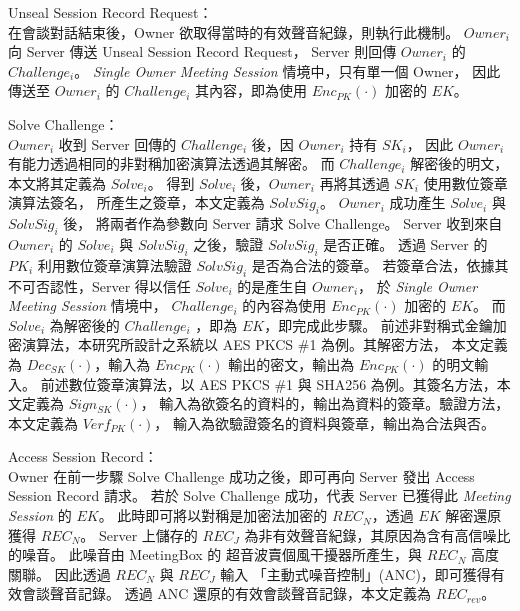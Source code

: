 \begin{steps}
    \item Unseal Session Record Request：\\
        在會談對話結束後，Owner 欲取得當時的有效聲音紀錄，則執行此機制。
        $Owner_{i}$ 向 Server 傳送 Unseal Session Record Request，
        Server 則回傳 $Owner_{i}$ 的 $Challenge_{i}$。
        {\it Single Owner Meeting Session} 情境中，只有單一個 Owner，
        因此傳送至 $Owner_{i}$ 的 $Challenge_{i}$ 其內容，即為使用 $Enc_{PK}(·)$ 加密的 $EK$。

    \item Solve Challenge：\\
        $Owner_{i}$ 收到 Server 回傳的 $Challenge_{i}$ 後，因 $Owner_{i}$ 持有 $SK_{i}$，
        因此 $Owner_{i}$ 有能力透過相同的非對稱加密演算法透過其解密。
        而 $Challenge_{i}$ 解密後的明文，本文將其定義為 $Solve_{i}$。
        得到 $Solve_{i}$ 後，$Owner_{i}$ 再將其透過 $SK_{i}$ 使用數位簽章演算法簽名，
        所產生之簽章，本文定義為 $SolvSig_{i}$。
        $Owner_{i}$ 成功產生 $Solve_{i}$ 與 $SolvSig_{i}$ 後，
        將兩者作為參數向 Server 請求 Solve Challenge。
        Server 收到來自$Owner_{i}$ 的 $Solve_{i}$ 與 $SolvSig_{i}$ 之後，驗證 $SolvSig_{i}$ 是否正確。
        透過 Server 的 $PK_{i}$ 利用數位簽章演算法驗證 $SolvSig_{i}$ 是否為合法的簽章。
        若簽章合法，依據其不可否認性，Server 得以信任 $Solve_{i}$ 的是產生自 $Owner_{i}$，
        於 {\it Single Owner Meeting Session} 情境中，
        $Challenge_{i}$ 的內容為使用 $Enc_{PK}(·)$ 加密的 $EK$。
        而 $Solve_{i}$ 為解密後的 $Challenge_{i}$ ，即為 $EK$，即完成此步驟。
        前述非對稱式金鑰加密演算法，本研究所設計之系統以 AES PKCS \#1 為例。其解密方法，
        本文定義為 $Dec_{SK}(·)$，輸入為 $Enc_{PK}(·)$ 輸出的密文，輸出為 $Enc_{PK}(·)$ 的明文輸入。
        前述數位簽章演算法，以 AES PKCS \#1 與 SHA256 為例。其簽名方法，本文定義為 $Sign_{SK}(·)$，
        輸入為欲簽名的資料的，輸出為資料的簽章。驗證方法，本文定義為 $Verf_{PK}(·)$，
        輸入為欲驗證簽名的資料與簽章，輸出為合法與否。

    \item Access Session Record：\\
        Owner 在前一步驟 Solve Challenge 成功之後，即可再向 Server 發出 Access Session Record 請求。
        若於 Solve Challenge 成功，代表 Server 已獲得此 {\it Meeting Session} 的 $EK$。
        此時即可將以對稱是加密法加密的 $REC_{N}$，透過 $EK$ 解密還原獲得 $REC_{N}$。
        Server 上儲存的 $REC_{J}$ 為非有效聲音紀錄，其原因為含有高信噪比的噪音。
        此噪音由 MeetingBox 的 超音波賣個風干擾器所產生，與 $REC_{N}$ 高度關聯。
        因此透過 $REC_{N}$ 與 $REC_{J}$ 輸入 「主動式噪音控制」(ANC)，即可獲得有效會談聲音記錄。
        透過 ANC 還原的有效會談聲音記錄，本文定義為 $REC_{rev}$。
\end{steps}


